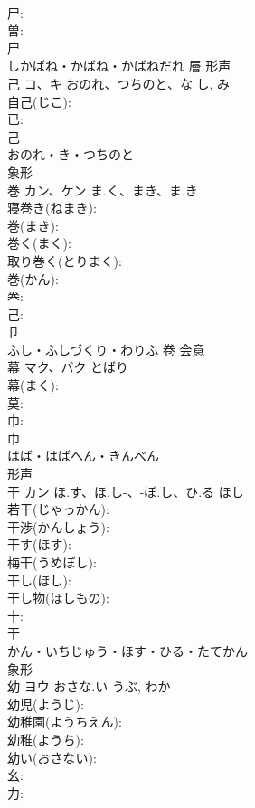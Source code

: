 \documentclass[8pt]{extreport}
\begin{document}
\begin{CJK}{UTF8}{min}
\\	尸: 
\\	曽: 
\\	尸	
\\	しかばね・かばね・かばねだれ	層	形声 
\\	己	コ、キ	おのれ、つちのと、な	し, み	
\\	自己(じこ): 
\\	已: 
\\	己	
\\	おのれ・き・つちのと	
\\	象形 
\\	巻	カン、ケン	ま.く、まき、ま.き		
\\	寝巻き(ねまき): 
\\	巻(まき): 
\\	巻く(まく): 
\\	取り巻く(とりまく): 
\\	巻(かん): 
\\	𠔉: 
\\	己: 
\\	卩	
\\	ふし・ふしづくり・わりふ	卷	会意 
\\	幕	マク、バク	とばり		
\\	幕(まく): 
\\	莫: 
\\	巾: 
\\	巾	
\\	はば・はばへん・きんべん	
\\	形声 
\\	干	カン	ほ.す、ほ.し-、-ぼ.し、ひ.る	ほし	
\\	若干(じゃっかん): 
\\	干渉(かんしょう): 
\\	干す(ほす): 
\\	梅干(うめぼし): 
\\	干し(ほし): 
\\	干し物(ほしもの): 
\\	十: 
\\	干	
\\	かん・いちじゅう・ほす・ひる・たてかん	
\\	象形 
\\	幼	ヨウ	おさな.い	うぶ, わか	
\\	幼児(ようじ): 
\\	幼稚園(ようちえん): 
\\	幼稚(ようち): 
\\	幼い(おさない): 
\\	幺: 
\\	力: 

\end{CJK}
\end{document}
